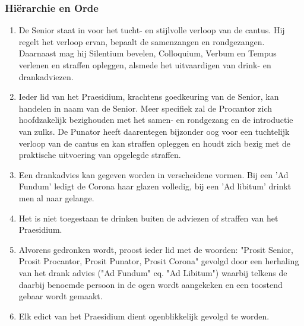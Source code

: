 \subsubsection*{Hi\"erarchie en Orde}
\begin{enumerate}
    \item De Senior staat in voor het tucht- en stijlvolle verloop van de cantus. Hij regelt het verloop ervan, bepaalt de samenzangen en rondgezangen. Daarnaast mag hij Silentium bevelen, Colloquium, Verbum en Tempus verlenen en straffen opleggen, alsmede het uitvaardigen van drink- en drankadviezen.
    \item Ieder lid van het Praesidium, krachtens goedkeuring van de Senior, kan handelen in naam van de Senior. Meer specifiek zal de Procantor zich hoofdzakelijk bezighouden met het samen- en rondgezang en de introductie van zulks. De Punator heeft daarentegen bijzonder oog voor een tuchtelijk verloop van de cantus en kan straffen opleggen en houdt zich bezig met de praktische uitvoering van opgelegde straffen.
    \item Een drankadvies kan gegeven worden in verscheidene vormen. Bij een 'Ad Fundum' ledigt de Corona haar glazen volledig, bij een 'Ad libitum' drinkt men al naar gelange.
    \item Het is niet toegestaan te drinken buiten de adviezen of straffen van het Praesidium. 
    \item Alvorens gedronken wordt, proost ieder lid met de woorden: "Prosit Senior, Prosit Procantor, Prosit Punator, Prosit Corona" gevolgd door een herhaling van het drank advies ("Ad Fundum" cq. "Ad Libitum") waarbij telkens de daarbij benoemde persoon in de ogen wordt aangekeken en een toostend gebaar wordt gemaakt.
    \item Elk edict van het Praesidium dient ogenblikkelijk gevolgd te worden.
\end{enumerate}

